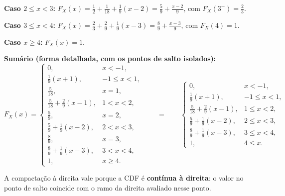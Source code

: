 \documentclass[11pt,a4paper]{article}
\begin{document}
\medskip
\noindent\textbf{Caso $2\le x<3$:}
$F_X(x)=\tfrac12+\tfrac1{18}+\tfrac19(x-2)=\tfrac59+\tfrac{x-2}{9}$,
com $F_X(3^-)=\tfrac23$.

\medskip
\noindent\textbf{Caso $3\le x<4$:}
$F_X(x)=\tfrac23+\tfrac29+\tfrac19(x-3)=\tfrac89+\tfrac{x-3}{9}$,
com $F_X(4)=1$.

\medskip
\noindent\textbf{Caso $x\ge4$:} $F_X(x)=1$.

\begin{resp}
\textbf{Sumário (forma detalhada, com os pontos de salto isolados):}
\[
F_X(x)=\begin{cases}
0, & x<-1,\\[2pt]
\frac19(x+1), & -1\le x<1,\\[2pt]
\frac{5}{18}, & x=1,\\[2pt]
\frac{5}{18}+\frac29(x-1), & 1<x<2,\\[2pt]
\frac59, & x=2,\\[2pt]
\frac59+\frac19(x-2), & 2<x<3,\\[2pt]
\frac89, & x=3,\\[2pt]
\frac89+\frac19(x-3), & 3<x<4,\\[2pt]
1, & x\ge4.
\end{cases}
\qquad=\qquad
\begin{cases}
0, & x<-1,\\[2pt]
\frac19(x+1), & -1\le x<1,\\[2pt]
\frac{5}{18}+\frac29(x-1), & 1\le x<2,\\[2pt]
\frac59+\frac19(x-2), & 2\le x<3,\\[2pt]
\frac89+\frac19(x-3), & 3\le x<4,\\[2pt]
1, & 4\le x.
\end{cases}
\]
\end{resp}

A compactação à direita vale porque a CDF é \textbf{contínua à direita}: o valor no
ponto de salto coincide com o ramo da direita avaliado nesse ponto.
\end{document}
